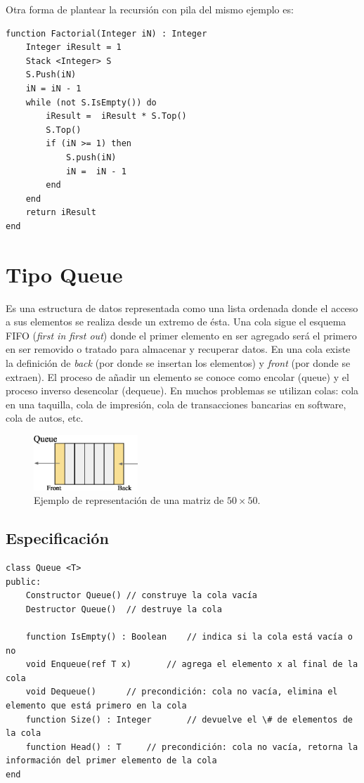 Otra forma de plantear la recursión con pila del mismo ejemplo es:
\begin{lstlisting}[upquote=true, language=pseudo]
function Factorial(Integer iN) : Integer
    Integer iResult = 1
    Stack <Integer> S
    S.Push(iN)
    iN = iN - 1
    while (not S.IsEmpty()) do
        iResult =  iResult * S.Top()
        S.Top()
        if (iN >= 1) then
            S.push(iN)
            iN =  iN - 1
        end
    end
    return iResult
end
\end{lstlisting}

\section{Tipo Queue}

Es una estructura de datos representada como una lista ordenada donde el acceso a sus elementos se realiza desde un extremo de ésta. Una cola sigue el esquema FIFO (\textit{first in first out}) donde el primer elemento en ser agregado será el primero en ser removido o tratado para almacenar y recuperar datos. En una cola existe la definición de \textit{back} (por donde se insertan los elementos) y \textit{front} (por donde se extraen). El proceso de añadir un elemento se conoce como encolar (queue) y el proceso inverso desencolar (dequeue). En muchos problemas se utilizan colas: cola en una taquilla, cola de impresión, cola de transacciones bancarias en software, cola de autos, etc.

\begin{figure}[htp!]
  \begin{center}
    \includegraphics[width=0.35\textwidth]{images/queue.eps}
  \end{center}
  \caption{Ejemplo de representación de una matriz de $50 \times 50$.}
  \label{fig:queue}
\end{figure}

\subsection{Especificación}

\begin{lstlisting}[upquote=true, language=pseudo]
class Queue <T>
public:
    Constructor Queue()	// construye la cola vacía
    Destructor Queue()	// destruye la cola

    function IsEmpty() : Boolean	// indica si la cola está vacía o no
    void Enqueue(ref T x)		// agrega el elemento x al final de la cola
    void Dequeue()		// precondición: cola no vacía, elimina el elemento que está primero en la cola
    function Size() : Integer		// devuelve el \# de elementos de la cola
    function Head() : T		// precondición: cola no vacía, retorna la información del primer elemento de la cola
end
\end{lstlisting}

